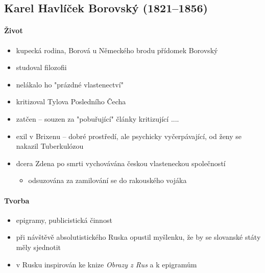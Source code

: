 \subsection{Karel Havlíček Borovský (1821--1856)}
\paragraph{Život}
\begin{itemize}
\item kupecká rodina, Borová u Německého brodu \ra přídomek Borovský
\item studoval filozofii
\item nelákalo ho "prázdné vlastenectví"
\item kritizoval Tylova Posledního Čecha
\item zatčen -- souzen za "pobuřující" články kritizující ....
\item exil v Brixenu -- dobré prostředí, ale psychicky vyčerpávající, od ženy se nakazil Tuberkulózou
\item dcera Zdena po smrti vychovávána českou vlasteneckou společností
	\begin{itemize}
	\item odsuzována za zamilování se do rakouského vojáka
	\end{itemize}
\end{itemize}

\paragraph{Tvorba}
\begin{itemize}

\item epigramy, publicistická činnost
\item při návštěvě absolutistického Ruska opustil myšlenku, že by se slovanské státy měly sjednotit
\item v Rusku inspirován ke knize \textit{Obrazy z Rus} a k epigramům
\end{itemize}


